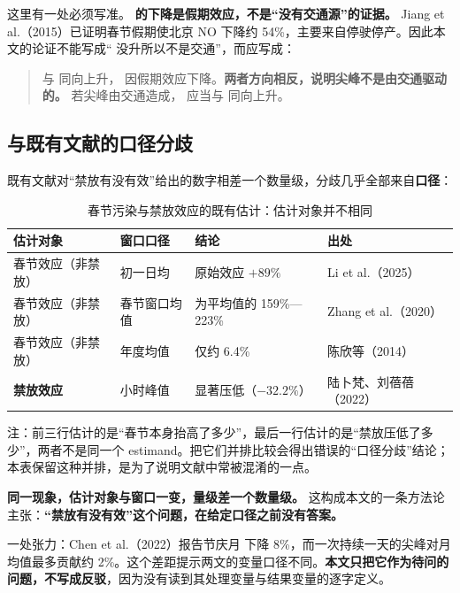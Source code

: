 这里有一处必须写准。\textbf{\NOtwo{} 的下降是假期效应，不是“没有交通源”的证据。} Jiang et al.（2015）已证明春节假期使北京 NO 下降约 54\%，主要来自停驶停产。因此本文的论证不能写成“\NOtwo{} 没升所以不是交通”，而应写成：

\begin{quote}
\SOtwo{} 与  同向上升，\NOtwo{} 因假期效应下降。\textbf{两者方向相反，说明尖峰不是由交通驱动的。} 若尖峰由交通造成，\NOtwo{} 应当与  同向上升。
\end{quote}

\subsection{与既有文献的口径分歧}

既有文献对“禁放有没有效”给出的数字相差一个数量级，分歧几乎全部来自\textbf{口径}：

\begin{table}[H]
\centering
\caption{春节污染与禁放效应的既有估计：估计对象并不相同}
\label{tab:caliber}
\small
\begin{tabular}{L{3.0cm}L{3.2cm}L{4.0cm}L{3.4cm}}
\toprule
\textbf{估计对象} & \textbf{窗口口径} & \textbf{结论} & \textbf{出处} \\
\midrule
春节效应（非禁放） & 初一日均 & 原始效应 $+89\%$ & Li et al.（2025） \\
春节效应（非禁放） & 春节窗口均值 & 为平均值的 159\%—223\% & Zhang et al.（2020） \\
春节效应（非禁放） & 年度均值 & 仅约 6.4\% & 陈欣等（2014） \\
\midrule
\textbf{禁放效应} & 小时峰值 & 显著压低（$-32.2\%$） & 陆卜梵、刘蓓蓓（2022） \\
\bottomrule
\end{tabular}

\vspace{0.3em}
{\small 注：前三行估计的是“春节本身抬高了多少”，最后一行估计的是“禁放压低了多少”，两者不是同一个 estimand。把它们并排比较会得出错误的“口径分歧”结论；本表保留这种并排，是为了说明文献中常被混淆的一点。}
\end{table}

\textbf{同一现象，估计对象与窗口一变，量级差一个数量级。} 这构成本文的一条方法论主张：\textbf{“禁放有没有效”这个问题，在给定口径之前没有答案。}

一处张力：Chen et al.（2022）报告节庆月  下降 8\%，而一次持续一天的尖峰对月均值最多贡献约 2\%。这个差距提示两文的变量口径不同。\textbf{本文只把它作为待问的问题，不写成反驳}，因为没有读到其处理变量与结果变量的逐字定义。

